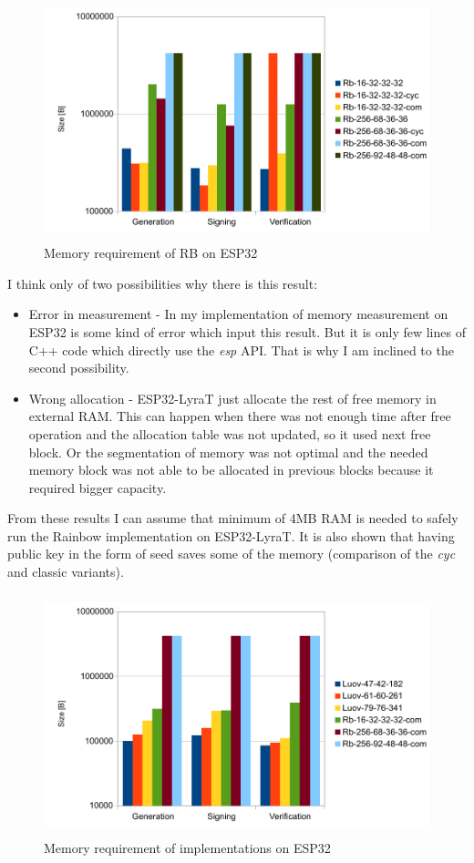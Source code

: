 \documentclass[thesis=M,english]{FITthesis}[2019/12/23]
\begin{document}
\begin{figure}[H]
\centering
\includegraphics[width=13cm,height=7cm]{images/mem-rb.pdf}
\caption{Memory requirement of RB on ESP32}
\label{mem-rb}
\end{figure}

\noindent
I think only of two possibilities why there is this result:
\begin{itemize}
\item	Error in measurement - In my implementation of memory measurement on ESP32 is some kind of error which input this result. But it is only few lines of C++ code which directly use the \textit{esp} API. That is why I am inclined to the second possibility.
\item	Wrong allocation - ESP32-LyraT just allocate the rest of free memory in external RAM. This can happen when there was not enough time after free operation and the allocation table was not updated, so it used next free block. Or the segmentation of memory was not optimal and the needed memory block was not able to be allocated in previous blocks because it required bigger capacity.
\end{itemize}

\bigskip
\noindent
From these results I can assume that minimum of 4MB RAM is needed to safely run the Rainbow implementation on ESP32-LyraT. It is also shown that having public key in the form of seed saves some of the memory (comparison of the \textit{cyc} and classic variants).

\begin{figure}[H]
\centering
\includegraphics[width=13cm,height=7cm]{images/mem-both.pdf}
\caption{Memory requirement of implementations on ESP32}
\label{mem-both}
\end{figure}
\end{document}
